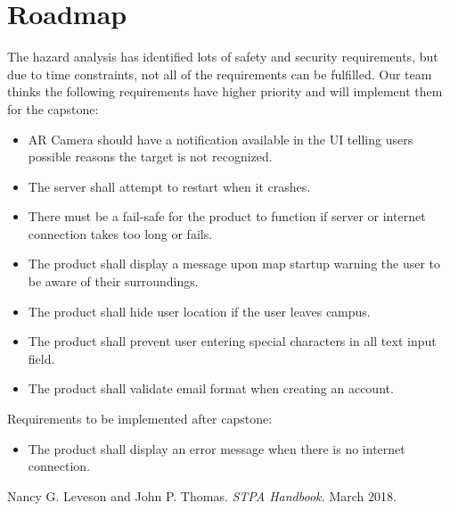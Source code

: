 \documentclass{article}
\begin{document}
\section{Roadmap}

The hazard analysis has identified lots of safety and security requirements, but due to time constraints,  not all of the requirements can be fulfilled. Our team thinks the following requirements have higher priority and will implement them for the capstone:
\begin{itemize}
    \item AR Camera should have a notification available in the UI telling users possible reasons the target is not recognized.
    \item The server shall attempt to restart when it crashes.
    \item There must be a fail-safe for the product to function if server or internet connection takes too long or fails.
    \item The product shall display a message upon map startup warning the user to be aware of their surroundings.
    \item The product shall hide user location if the user leaves campus.
    \item The product shall prevent user entering special characters in all text input field.
    \item The product shall validate email format when creating an account.
\end{itemize}

\noindent
Requirements to be implemented after capstone:
\begin{itemize}
    \item The product shall display an error message when there is no internet connection.
\end{itemize}

\newpage

\begin{thebibliography}{9}
   Nancy G. Leveson and John P. Thomas. \emph{STPA Handbook.} March 2018.
\end{thebibliography}
\end{document}
